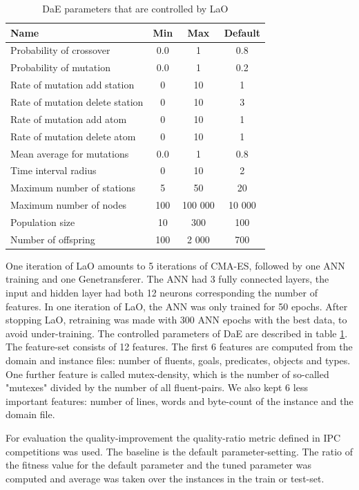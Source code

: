 \documentclass{sig-alt-release2}
\begin{document}
\begin{table}[ht] \small
\centering
\begin{tabular}{l c c c}
\hline\hline
Name & Min & Max & Default \\ 
\hline
Probability of crossover & 0.0 & 1 & 0.8 \\
Probability of mutation & 0.0& 1& 0.2 \\
Rate of mutation add station& 0& 10& 1 \\
Rate of mutation delete station& 0& 10& 3 \\
Rate of mutation add atom& 0& 10& 1 \\
Rate of mutation delete atom& 0& 10& 1 \\
Mean average for mutations& 0.0& 1& 0.8 \\
Time interval radius& 0& 10& 2 \\
Maximum number of stations& 5& 50& 20 \\
Maximum number of nodes& 100& 100 000& 10 000 \\
Population size& 10& 300& 100 \\
Number of offspring & 100& 2 000& 700 \\
\hline
\end{tabular}
\caption{DaE parameters that are controlled by LaO}
\label{table:parameters}
\end{table} 

One iteration of LaO amounts to 5 iterations of CMA-ES, followed by one ANN training and one Genetransferer. The ANN had 3 fully connected layers, the input and hidden layer had both 12 neurons corresponding the number of features. In one iteration of LaO, the ANN was only trained for 50 epochs. After stopping LaO, retraining was made with 300 ANN epochs with the best data, to avoid under-training. The controlled parameters of DaE are described in table \ref{table:parameters}. The feature-set consists of 12 features. The first 6 features are computed from the domain and instance files: number of fluents, goals, predicates, objects and types. One further feature is called mutex-density, which is the number of so-called "mutexes" divided by the number of all fluent-pairs. We also kept 6 less important features: number of lines, words and byte-count of the instance and the domain file.

For evaluation the quality-improvement the quality-ratio metric defined in IPC competitions was used. The baseline is the default parameter-setting. The ratio of the fitness value for the default parameter and the tuned parameter was computed and average was taken over the instances in the train or test-set. 
\end{document}
